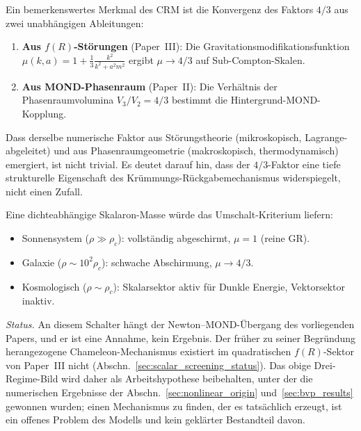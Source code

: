 \documentclass[aps,prd,twocolumn,superscriptaddress,nofootinbib]{revtex4-2}
\begin{document}
Ein bemerkenswertes Merkmal des CRM ist die Konvergenz des Faktors $4/3$ aus zwei unabh\"angigen Ableitungen:

\begin{enumerate}
\item \textbf{Aus $f(R)$-St\"orungen} (Paper~III): Die Gravitationsmodifikationsfunktion $\mu(k,a) = 1 + \frac{1}{3}\frac{k^2}{k^2 + a^2 m^2}$ ergibt $\mu \to 4/3$ auf Sub-Compton-Skalen.

\item \textbf{Aus MOND-Phasenraum} (Paper~II): Die Verh\"altnis der Phasenraumvolumina $V_3/V_2 = 4/3$ bestimmt die Hintergrund-MOND-Kopplung.
\end{enumerate}

Dass derselbe numerische Faktor aus St\"orungstheorie (mikroskopisch, Lagrange-abgeleitet) und aus Phasenraumgeometrie (makroskopisch, thermodynamisch) emergiert, ist nicht trivial. Es deutet darauf hin, dass der $4/3$-Faktor eine tiefe strukturelle Eigenschaft des Kr\"ummungs-R\"uckgabemechanismus widerspiegelt, nicht einen Zufall.

Eine dichteabh\"angige Skalaron-Masse w\"urde das Umschalt-Kriterium liefern:
\begin{itemize}
\item Sonnensystem ($\rho \gg \rho_c$): vollst\"andig abgeschirmt, $\mu = 1$ (reine GR).
\item Galaxie ($\rho \sim 10^2\rho_c$): schwache Abschirmung, $\mu \to 4/3$.
\item Kosmologisch ($\rho \sim \rho_c$): Skalarsektor aktiv f\"ur Dunkle Energie, Vektorsektor inaktiv.
\end{itemize}

\textit{Status.} An diesem Schalter h\"angt der Newton--MOND-\"Ubergang des vorliegenden Papers, und er ist eine Annahme, kein Ergebnis. Der fr\"uher zu seiner Begr\"undung herangezogene Chameleon-Mechanismus existiert im quadratischen $f(R)$-Sektor von Paper~III nicht (Abschn.~\ref{sec:scalar_screening_status}). Das obige Drei-Regime-Bild wird daher als Arbeitshypothese beibehalten, unter der die numerischen Ergebnisse der Abschn.~\ref{sec:nonlinear_origin} und~\ref{sec:bvp_results} gewonnen wurden; einen Mechanismus zu finden, der es tats\"achlich erzeugt, ist ein offenes Problem des Modells und kein gekl\"arter Bestandteil davon.


\end{document}

